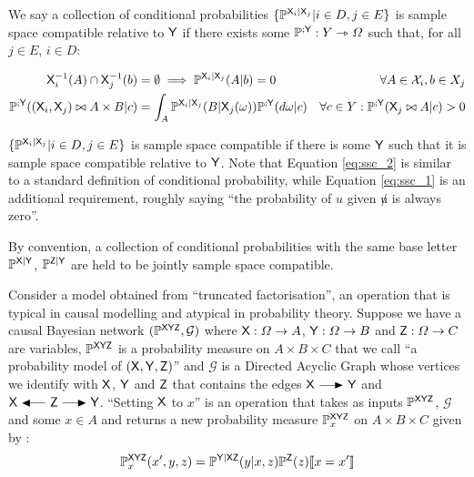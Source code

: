 We say a collection of conditional probabilities $\{\mathbb{P}^{\mathsf{X}_i|\mathsf{X}_j}|i\in D, j\in E\}$ is sample space compatible relative to $\mathsf{Y}$ if there exists some $\mathbb{P}^{;\mathsf{Y}}:Y\rightarrowtriangle \Omega$ such that, for all $j\in E$, $i\in D$:

\begin{align}
	\mathsf{X}_i^{-1}(A)\cap \mathsf{X}_{j}^{-1}(b) &= \emptyset \implies \mathbb{P}^{\mathsf{X}_i|\mathsf{X}_j}(A|b)=0 &\forall A\in \mathcal{X}_i, b\in X_j \label{eq:ssc_1}\\
	\mathbb{P}^{;\mathsf{Y}}((\mathsf{X}_i,\mathsf{X}_j)\bowtie A\times B|c) &= \int_A \mathbb{P}^{\mathsf{X}_{i}|\mathsf{X}_j}(B|\mathsf{X}_j(\omega))\mathbb{P}^{;\mathsf{Y}}(d\omega|c) &\forall c\in Y:\mathbb{P}^{;\mathsf{Y}}(\mathsf{X}_j\bowtie A|c)>0 \label{eq:ssc_2}
\end{align}

$\{\mathbb{P}^{\mathsf{X}_i|\mathsf{X}_j}|i\in D, j\in E\}$ is sample space compatible if there is some $\mathsf{Y}$ such that it is sample space compatible relative to $\mathsf{Y}$. Note that Equation \ref{eq:ssc_2} is similar to a standard definition of conditional probability, while Equation \ref{eq:ssc_1} is an additional requirement, roughly saying ``the probability of $u$ given $\not u$ is always zero''. 

By convention, a collection of conditional probabilities with the same base letter $\mathbb{P}^{\mathsf{X}|\mathsf{Y}}$, $\mathbb{P}^{\mathsf{Z}|\mathsf{Y}}$ are held to be jointly sample space compatible.

Consider a model obtained from ``truncated factorisation'', an operation that is typical in causal modelling and atypical in probability theory. Suppose we have a causal Bayesian network $(\mathbb{P}^{\mathsf{XYZ}},\mathcal{G})$ where $\mathsf{X}:\Omega\to A$, $\mathsf{Y}:\Omega\to B$ and $\mathsf{Z}:\Omega\to C$ are variables, $\mathbb{P}^{\mathsf{XYZ}}$ is a probability measure on $A\times B\times C$ that we call ``a probability model of $(\mathsf{X},\mathsf{Y},\mathsf{Z})$'' and $\mathcal{G}$ is a Directed Acyclic Graph whose vertices we identify with $\mathsf{X}$, $\mathsf{Y}$ and $\mathsf{Z}$ that contains the edges $\RV{X}\longrightarrowRHD \RV{Y}$ and $\RV{X}\longleftarrowRHD \RV{Z} \longrightarrowRHD \RV{Y}$. ``Setting $\mathsf{X}$ to $x$'' is an operation that takes as inputs $\mathbb{P}^{\mathsf{XYZ}}$, $\mathcal{G}$ and some $x\in A$ and returns a new probability measure $\mathbb{P}_x^{\mathsf{XYZ}}$ on $A\times B\times C$ given by \citep[page ~24]{pearl_causality:_2009}:
\begin{align}
	\mathbb{P}^{\mathsf{XYZ}}_{x}(x',y,z)=\mathbb{P}^{\mathsf{Y|XZ}}(y|x,z)\mathbb{P}^{\mathsf{Z}}(z)\llbracket x=x' \rrbracket\label{eq:truncated_fac}
\end{align}

